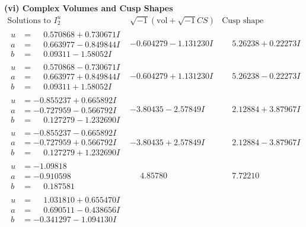 \documentclass[1p]{elsarticle_modified}
\theoremstyle{definition}
\newcommand{\I}{\sqrt{-1}}
\begin{document}
\newpage\flushleft \textbf{(vi) Complex Volumes and Cusp Shapes}
$$\begin{array}{c|c|c}  
\text{Solutions to }I^u_{2}& \I (\text{vol} + \sqrt{-1}CS) & \text{Cusp shape}\\
 \hline 
\begin{aligned}
u &= \phantom{-}0.570868 + 0.730671 I \\
a &= \phantom{-}0.663977 - 0.849844 I \\
b &= \phantom{-}0.09311 - 1.58052 I\end{aligned}
 & -0.604279 - 1.131230 I & \phantom{-}5.26238 + 0.22273 I \\ \hline\begin{aligned}
u &= \phantom{-}0.570868 - 0.730671 I \\
a &= \phantom{-}0.663977 + 0.849844 I \\
b &= \phantom{-}0.09311 + 1.58052 I\end{aligned}
 & -0.604279 + 1.131230 I & \phantom{-}5.26238 - 0.22273 I \\ \hline\begin{aligned}
u &= -0.855237 + 0.665892 I \\
a &= -0.727959 - 0.566792 I \\
b &= \phantom{-}0.127279 - 1.232690 I\end{aligned}
 & -3.80435 - 2.57849 I & \phantom{-}2.12884 + 3.87967 I \\ \hline\begin{aligned}
u &= -0.855237 - 0.665892 I \\
a &= -0.727959 + 0.566792 I \\
b &= \phantom{-}0.127279 + 1.232690 I\end{aligned}
 & -3.80435 + 2.57849 I & \phantom{-}2.12884 - 3.87967 I \\ \hline\begin{aligned}
u &= -1.09818\phantom{ +0.000000I} \\
a &= -0.910598\phantom{ +0.000000I} \\
b &= \phantom{-}0.187581\phantom{ +0.000000I}\end{aligned}
 & \phantom{-}4.85780\phantom{ +0.000000I} & \phantom{-}7.72210\phantom{ +0.000000I} \\ \hline\begin{aligned}
u &= \phantom{-}1.031810 + 0.655470 I \\
a &= \phantom{-}0.690511 - 0.438656 I \\
b &= -0.341297 - 1.094130 I\end{aligned}

\end{array}$$
\end{document}
